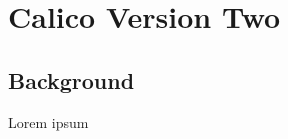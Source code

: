 \chapter{Calico Version Two}
\label{chapter:calico-version-two}

\section{Background}

Lorem ipsum 


